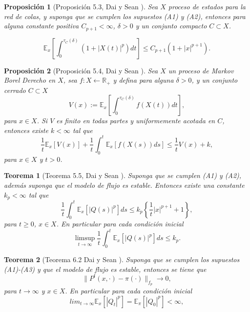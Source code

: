 \documentclass{article}
\newtheorem{Teo}{Teorema}
\newtheorem{Prop}{Proposición}
\newcommand{\rea}{\mathbb{R}}
\newcommand{\esp}{\mathbb{E}}
\begin{document}
\begin{Prop}[Proposici\'on 5.3, Dai y Sean \cite{DaiSean}]\label{Prop.5.3.DaiSean}
Sea $X$ proceso de estados para la red de colas, y suponga que se
cumplen los supuestos (A1) y (A2), entonces para alguna constante
positiva $C_{p+1}<\infty$, $\delta>0$ y un conjunto compacto
$C\subset X$.

\begin{equation}\label{Eq.5.4}
\esp_{x}\left[\int_{0}^{\tau_{C}\left(\delta\right)}\left(1+|X\left(t\right)|^{p}\right)dt\right]\leq
C_{p+1}\left(1+|x|^{p+1}\right).
\end{equation}
\end{Prop}

\begin{Prop}[Proposici\'on 5.4, Dai y Sean \cite{DaiSean}]\label{Prop.5.4.DaiSean}
Sea $X$ un proceso de Markov Borel Derecho en $X$, sea
$f:X\leftarrow\rea_{+}$ y defina para alguna $\delta>0$, y un
conjunto cerrado $C\subset X$
\[V\left(x\right):=\esp_{x}\left[\int_{0}^{\tau_{C}\left(\delta\right)}f\left(X\left(t\right)\right)dt\right],\]
para $x\in X$. Si $V$ es finito en todas partes y uniformemente
acotada en $C$, entonces existe $k<\infty$ tal que
\begin{equation}\label{Eq.5.11}
\frac{1}{t}\esp_{x}\left[V\left(x\right)\right]+\frac{1}{t}\int_{0}^{t}\esp_{x}\left[f\left(X\left(s\right)\right)ds\right]\leq\frac{1}{t}V\left(x\right)+k,
\end{equation}
para $x\in X$ y $t>0$.
\end{Prop}


\begin{Teo}[Teorema 5.5, Dai y Sean  \cite{DaiSean}]
Suponga que se cumplen (A1) y (A2), adem\'as suponga que el modelo
de flujo es estable. Entonces existe una constante $k_{p}<\infty$
tal que
\begin{equation}\label{Eq.5.13}
\frac{1}{t}\int_{0}^{t}\esp_{x}\left[|Q\left(s\right)|^{p}\right]ds\leq
k_{p}\left\{\frac{1}{t}|x|^{p+1}+1\right\},
\end{equation}
para $t\geq0$, $x\in X$. En particular para cada condici\'on
inicial
\begin{equation}\label{Eq.5.14}
\limsup_{t\rightarrow\infty}\frac{1}{t}\int_{0}^{t}\esp_{x}\left[|Q\left(s\right)|^{p}\right]ds\leq
k_{p}.
\end{equation}
\end{Teo}

\begin{Teo}[Teorema 6.2 Dai y Sean \cite{DaiSean}]\label{Tma.6.2}
Suponga que se cumplen los supuestos (A1)-(A3) y que el modelo de
flujo es estable, entonces se tiene que
\[\parallel P^{t}\left(x,\cdot\right)-\pi\left(\cdot\right)\parallel_{f_{p}}\rightarrow0,\]
para $t\rightarrow\infty$ y $x\in X$. En particular para cada
condici\'on inicial
\[lim_{t\rightarrow\infty}\esp_{x}\left[\left|Q_{t}\right|^{p}\right]=\esp_{\pi}\left[\left|Q_{0}\right|^{p}\right]<\infty,\]
\end{Teo}
\end{document}
